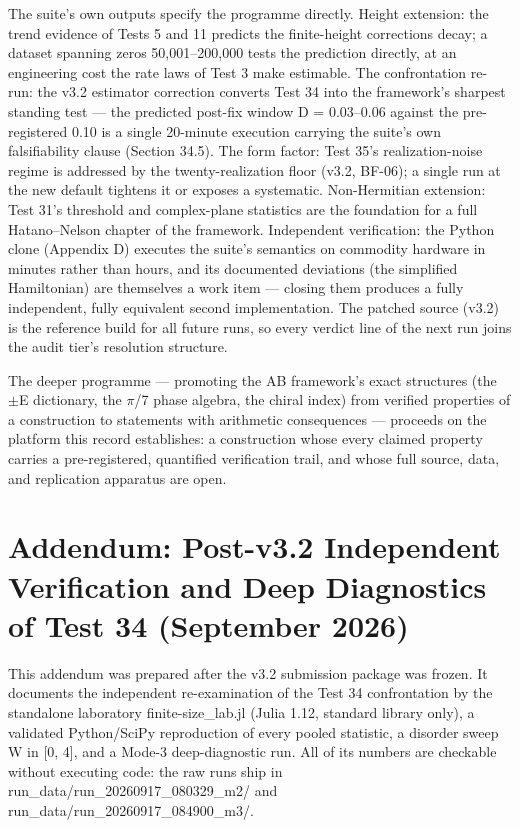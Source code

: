 \documentclass[10pt]{article}
\begin{document}
The suite's own outputs specify the programme directly. Height extension: the trend evidence of Tests 5 and 11 predicts the finite-height corrections decay; a dataset spanning zeros 50,001--200,000 tests the prediction directly, at an engineering cost the rate laws of Test 3 make estimable. The confrontation re-run: the v3.2 estimator correction converts Test 34 into the framework's sharpest standing test --- the predicted post-fix window D = 0.03--0.06 against the pre-registered 0.10 is a single 20-minute execution carrying the suite's own falsifiability clause (Section 34.5). The form factor: Test 35's realization-noise regime is addressed by the twenty-realization floor (v3.2, BF-06); a single run at the new default tightens it or exposes a systematic. Non-Hermitian extension: Test 31's threshold and complex-plane statistics are the foundation for a full Hatano--Nelson chapter of the framework. Independent verification: the Python clone (Appendix D) executes the suite's semantics on commodity hardware in minutes rather than hours, and its documented deviations (the simplified Hamiltonian) are themselves a work item --- closing them produces a fully independent, fully equivalent second implementation. The patched source (v3.2) is the reference build for all future runs, so every verdict line of the next run joins the audit tier's resolution structure.

The deeper programme --- promoting the AB framework's exact structures (the $\pm$E dictionary, the $\pi$/7 phase algebra, the chiral index) from verified properties of a construction to statements with arithmetic consequences --- proceeds on the platform this record establishes: a construction whose every claimed property carries a pre-registered, quantified verification trail, and whose full source, data, and replication apparatus are open.

\section{Addendum: Post-v3.2 Independent Verification and Deep Diagnostics of Test 34 (September 2026)}\label{sec:addendum}


This addendum was prepared after the v3.2 submission package was frozen. It documents the independent re-examination of the Test 34 confrontation by the standalone laboratory finite-size\_lab.jl (Julia 1.12, standard library only), a validated Python/SciPy reproduction of every pooled statistic, a disorder sweep W in [0, 4], and a Mode-3 deep-diagnostic run. All of its numbers are checkable without executing code: the raw runs ship in run\_data/run\_20260917\_080329\_m2/ and run\_data/run\_20260917\_084900\_m3/.
\end{document}
